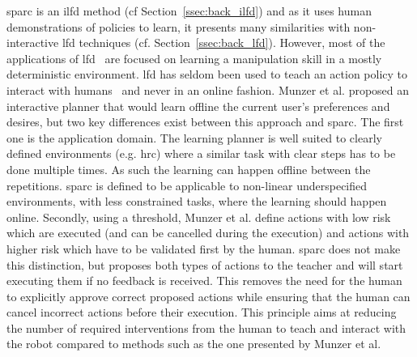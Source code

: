 \gls{sparc} is an \gls{ilfd} method (cf Section~\ref{ssec:back_ilfd}) and as it uses human demonstrations of policies to learn, it presents many similarities with non-interactive \gls{lfd} techniques (cf. Section~\ref{ssec:back_lfd}). However, most of the applications of \gls{lfd}~\citep{argall2009survey,billard2008robot} are focused on learning a manipulation skill in a mostly deterministic environment. \gls{lfd} has seldom been used to teach an action policy to interact with humans~\citep{liu2014train,sequeira2016discovering,munzer2017efficient} and never in an online fashion. Munzer et al. proposed an interactive planner that would learn offline the current user's preferences and desires, but two key differences exist between this approach and \gls{sparc}. The first one is the application domain. The learning planner is well suited to clearly defined environments (e.g. \gls{hrc}) where a similar task with clear steps has to be done multiple times. As such the learning can happen offline between the repetitions. \gls{sparc} is defined to be applicable to non-linear underspecified environments, with less constrained tasks, where the learning should happen online. Secondly, using a threshold, Munzer et al. define actions with low risk which are executed (and can be cancelled during the execution) and actions with higher risk which have to be validated first by the human. \gls{sparc} does not make this distinction, but proposes both types of actions to the teacher and will start executing them if no feedback is received. This removes the  need for the human to explicitly approve correct proposed actions while ensuring that the human can cancel incorrect actions before their execution. This principle aims at reducing the number of required interventions from the human to teach and interact with the robot compared to methods such as the one presented by Munzer et al. 

    

